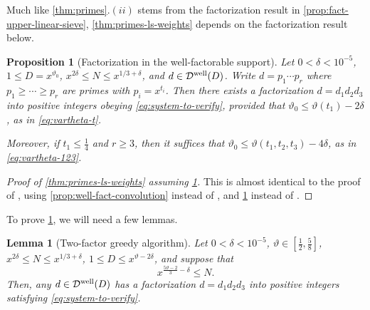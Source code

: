 \documentclass[reqno,11pt]{amsart}
\newtheorem{proposition}[theorem]{Proposition}
\newtheorem{lemma}[theorem]{Lemma}
\theoremstyle{remark}
\numberwithin{equation}{section}
\newcommand{\mDw}{\mathcal{D}^{\textnormal{well}}}
\begin{document}
Much like \cref{thm:primes}.$(ii)$ stems from the factorization result in \cref{prop:fact-upper-linear-sieve},
\cref{thm:primes-ls-weights} depends on the factorization result below.

\begin{proposition}[Factorization in the well-factorable support] \label{prop:fact-well-fact}
Let $0 < \delta < 10^{-5}$, $1 \le D = x^{\vartheta_0}$, $x^{2\delta} \le N \le x^{1/3+\delta}$, and $d \in \mDw(D)$. Write $d = p_1\cdots p_r$ where $p_1 \ge \cdots \ge p_r$ are primes with $p_i = x^{t_i}$. Then there exists a factorization $d = d_1d_2d_3$ into positive integers obeying \cref{eq:system-to-verify}, provided that $\vartheta_0 \le \vartheta(t_1) - 2\delta$,
as in \cref{eq:vartheta-t}.

Moreover, if $t_1 \le \tfrac{1}{4}$ and $r \ge 3$, then it suffices that
$\vartheta_0 \le \vartheta(t_1, t_2, t_3) - 4\delta$,
as in \cref{eq:vartheta-123}.
\end{proposition}

\begin{proof}[Proof of \cref{thm:primes-ls-weights} assuming \cref{prop:fact-well-fact}]
This is almost identical to the proof of \cite[Proposition 5.4]{lichtman2025modification}, using \cref{prop:well-fact-convolution} instead of \cite[Theorem 2.5]{lichtman2025modification}, and \cref{prop:fact-well-fact} instead of \cite[Proposition 3.3]{lichtman2025modification}.
\end{proof}

To prove \cref{prop:fact-well-fact}, we will need a few lemmas.

\begin{lemma}[Two-factor greedy algorithm] \label{lem:extreme-ranges}
Let $0 < \delta < 10^{-5}$, $\vartheta \in [\tfrac{1}{2}, \tfrac{5}{8}]$, $x^{2\delta} \le N \le x^{1/3+\delta}$, $1 \le D \le x^{\vartheta-2\delta}$, and suppose that
\[
    x^{\frac{5\vartheta-2}{3}-\delta} \le N.
\]
Then, any $d \in \mDw(D)$ has a factorization $d = d_1d_2d_3$ into positive integers satisfying \cref{eq:system-to-verify}.
\end{lemma}
\end{document}
